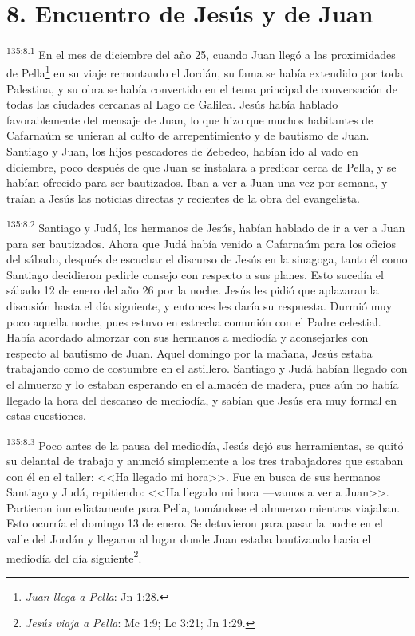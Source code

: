 \section*{8. Encuentro de Jesús y de Juan}
\par 
\textsuperscript{135:8.1} En el mes de diciembre del año 25, cuando Juan llegó a las proximidades de Pella\footnote{\textit{Juan llega a Pella}: Jn 1:28.} en su viaje remontando el Jordán, su fama se había extendido por toda Palestina, y su obra se había convertido en el tema principal de conversación de todas las ciudades cercanas al Lago de Galilea. Jesús había hablado favorablemente del mensaje de Juan, lo que hizo que muchos habitantes de Cafarnaúm se unieran al culto de arrepentimiento y de bautismo de Juan. Santiago y Juan, los hijos pescadores de Zebedeo, habían ido al vado en diciembre, poco después de que Juan se instalara a predicar cerca de Pella, y se habían ofrecido para ser bautizados. Iban a ver a Juan una vez por semana, y traían a Jesús las noticias directas y recientes de la obra del evangelista.

\par 
\textsuperscript{135:8.2} Santiago y Judá, los hermanos de Jesús, habían hablado de ir a ver a Juan para ser bautizados. Ahora que Judá había venido a Cafarnaúm para los oficios del sábado, después de escuchar el discurso de Jesús en la sinagoga, tanto él como Santiago decidieron pedirle consejo con respecto a sus planes. Esto sucedía el sábado 12 de enero del año 26 por la noche. Jesús les pidió que aplazaran la discusión hasta el día siguiente, y entonces les daría su respuesta. Durmió muy poco aquella noche, pues estuvo en estrecha comunión con el Padre celestial. Había acordado almorzar con sus hermanos a mediodía y aconsejarles con respecto al bautismo de Juan. Aquel domingo por la mañana, Jesús estaba trabajando como de costumbre en el astillero. Santiago y Judá habían llegado con el almuerzo y lo estaban esperando en el almacén de madera, pues aún no había llegado la hora del descanso de mediodía, y sabían que Jesús era muy formal en estas cuestiones.

\par 
\textsuperscript{135:8.3} Poco antes de la pausa del mediodía, Jesús dejó sus herramientas, se quitó su delantal de trabajo y anunció simplemente a los tres trabajadores que estaban con él en el taller: <<Ha llegado mi hora>>. Fue en busca de sus hermanos Santiago y Judá, repitiendo: <<Ha llegado mi hora ---vamos a ver a Juan>>. Partieron inmediatamente para Pella, tomándose el almuerzo mientras viajaban. Esto ocurría el domingo 13 de enero. Se detuvieron para pasar la noche en el valle del Jordán y llegaron al lugar donde Juan estaba bautizando hacia el mediodía del día siguiente\footnote{\textit{Jesús viaja a Pella}: Mc 1:9; Lc 3:21; Jn 1:29.}.

